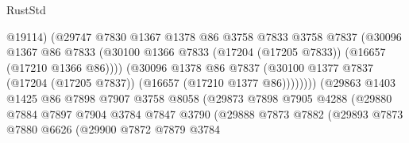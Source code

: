 \begin{lexlean}{RustStd}
\begin{coremodule}
                                      @19114)
                                    (@29747
                                      @7830
                                      @1367
                                      @1378
                                      @86
                                      @3758
                                      @7833
                                      @3758
                                      @7837
                                      (@30096
                                        @1367
                                        @86
                                        @7833
                                        (@30100
                                          @1366
                                          @7833
                                          (@17204 (@17205 @7833))
                                          (@16657 (@17210 @1366 @86))))
                                      (@30096
                                        @1378
                                        @86
                                        @7837
                                        (@30100
                                          @1377
                                          @7837
                                          (@17204 (@17205 @7837))
                                          (@16657 (@17210 @1377 @86))))))))
                              (@29863
                                @1403
                                @1425
                                @86
                                @7898
                                @7907
                                @3758
                                @8058
                                (@29873
                                  @7898
                                  @7905
                                  @4288
                                  (@29880
                                    @7884
                                    @7897
                                    @7904
                                    @3784
                                    @7847
                                    @3790
                                    (@29888
                                      @7873
                                      @7882
                                      (@29893
                                        @7873
                                        @7880
                                        @6626
                                        (@29900
                                          @7872
                                          @7879
                                          @3784

\end{coremodule}
\end{lexlean}
